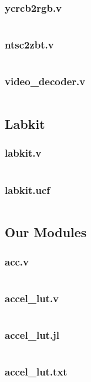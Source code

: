 \documentclass{article}
\begin{document}
\subsubsection{ycrcb2rgb.v}
\inputminted[linenos]{verilog}{../../src/ycrcb2rgb.v}
\subsubsection{ntsc2zbt.v}
\inputminted[linenos]{verilog}{../../src/ntsc2zbt.v}
\subsubsection{video\_decoder.v}
\inputminted[linenos]{verilog}{../../src/video_decoder.v}

\subsection{Labkit}
\subsubsection{labkit.v}
\inputminted[linenos]{verilog}{../../src/labkit.v}
\subsubsection{labkit.ucf}
\inputminted[linenos]{verilog}{../../src/labkit.ucf}

\subsection{Our Modules}
\subsubsection{acc.v}
\inputminted[linenos]{verilog}{../../src/acc.v}
\subsubsection{accel\_lut.v}
\inputminted[linenos]{verilog}{../../src/accel_lut.v}
\subsubsection{accel\_lut.jl}
\inputminted[linenos]{julia}{../../src/accel_lut.jl}
\subsubsection{accel\_lut.txt}
\inputminted[linenos]{todotxt}{../../src/accel_lut.txt}
\end{document}
